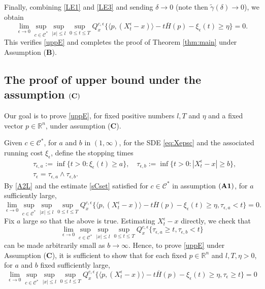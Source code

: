 \documentclass[11pt,reqno]{amsart}
\theoremstyle{definition}
\theoremstyle{remark}
\numberwithin{equation}{section}
\newcommand{\eps}{\epsilon}
\newcommand{\R}{{\mathbb{R}}}
\begin{document}
Finally, combining \eqref{LE1} and \eqref{LE3} and sending $\delta\to 0$ (note then $\widetilde{\gamma}(\delta)\to 0$), we obtain
\begin{equation*}
    \lim_{\epsilon\to 0}\sup_{c\in\mathscr{C}^{\ast}} \sup_{|x| \leq l} \sup_{0 \leq t \leq T} Q^{c, \epsilon}_{x} \{ \langle p, (X^{\epsilon}_{t} -x) \rangle - t\overline{H}(p)- \xi_{\epsilon}(t) \geq \eta \} = 0.
\end{equation*}
This verifies \eqref{uppE} and completes the proof of Theorem \ref{thm:main} under Assumption ({\bf B}).

\medskip 

\subsection{The proof of upper bound under the assumption $(\bf{C})$}

Our goal is to prove \eqref{uppE}, for fixed positive numbers $l,T$ and $\eta$ and a fixed vector $p\in \R^n$, under assumption ({\bf C}). 

Given $c\in \mathscr{C}^*$, for $a$ and $b$ in $(1,\infty)$, for the SDE \eqref{eq:Xepsc} and the associated running cost $\xi_\eps$, define the stopping times
\begin{equation*}
\begin{aligned}
    &\tau_{\epsilon,a} := \inf \{t>0: \xi_{\epsilon}(t) \geq a \}, \quad \tau_{\epsilon,b} := \inf \{t>0: |X^{\epsilon}_{t} - x| \geq b\},\\
    &\tau_{\epsilon} = \tau_{\epsilon,a} \wedge \tau_{\epsilon,b}.
    \end{aligned}
\end{equation*}
By \eqref{A2L} and the estimate \eqref{sCset} satisfied for $c \in \mathscr{C}^*$ in assumption $(\bf A1)$, for $a$ sufficiently large,
\begin{equation}
    \lim_{\epsilon\to 0}\sup_{c\in\mathscr{C}^{\ast}} \sup_{|x| \leq l} \sup_{0 \leq t \leq T} Q^{c, \epsilon}_{x} \{\langle p, (X^{\epsilon}_{t} -x) \rangle - t\overline{H}(p)- \xi_{\epsilon}(t) \geq \eta, \tau_{\epsilon,a} < t\} = 0.
\end{equation}
Fix $a$ large so that the above is true. Estimating $X^\eps_t-x$ directly, we check that 
\begin{equation}
    \lim_{\epsilon\to 0}\sup_{c\in\mathscr{C}^{\ast}} \sup_{|x| \leq l} \sup_{0 \leq t \leq T} Q^{c, \epsilon}_{x} \{
\tau_{\eps,a}\ge t, \tau_{\epsilon,b} < t\}
\end{equation}
can be made arbitrarily small as $b \to \infty$. Hence, to prove \eqref{uppE} under Assumption ({\bf C}), it is sufficient to show that for each fixed $p\in\mathbb{R}^n$ and $l, T, \eta>0$, for $a$ and $b$ fixed sufficiently large, 
\begin{equation}
\label{43UP}
     \lim_{\epsilon\to 0}\sup_{c\in\mathscr{C}^{\ast}} \sup_{|x| \leq l} \sup_{0 \leq t \leq T} Q^{c, \epsilon}_{x} \{ \langle p, (X^{\epsilon}_{t} -x) \rangle - t\overline{H}(p)- \xi_{\epsilon}(t) \geq \eta, \tau_{\epsilon} \geq t \} = 0
\end{equation}
\end{document}
